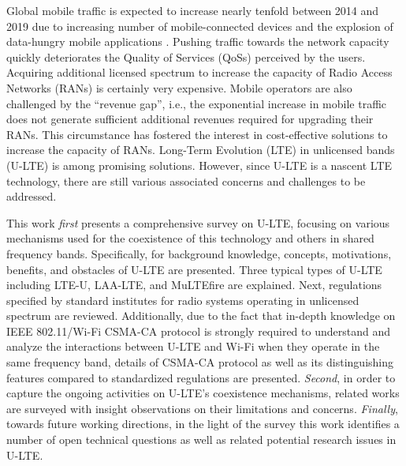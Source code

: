 \textsf{Global mobile traffic is expected to increase nearly tenfold between 2014 and 2019 due to increasing number of mobile-connected devices and the explosion of data-hungry mobile applications \cite{cisco_mobile_traffic_2015}. Pushing traffic towards the network capacity quickly deteriorates the Quality of Services (QoSs) perceived by the users. Acquiring additional licensed spectrum to increase the capacity of Radio Access Networks (RANs) is certainly very expensive. Mobile operators are also challenged by the ``revenue gap'', i.e., the exponential increase in mobile traffic does not generate sufficient additional revenues required for upgrading their RANs. This circumstance has fostered the interest in cost-effective solutions to increase the capacity of RANs. Long-Term Evolution (LTE) in unlicensed bands (U-LTE) is among promising solutions. However, since U-LTE is a nascent LTE technology, there are still various associated concerns and challenges to be addressed.}

\textsf{This work \textit{first} presents a comprehensive survey on U-LTE, focusing on various mechanisms used for the coexistence of this technology and others in shared frequency bands. Specifically, for background knowledge, concepts, motivations, benefits, and obstacles of U-LTE are presented. Three typical types of U-LTE including LTE-U, LAA-LTE, and MuLTEfire are explained. Next, regulations specified by standard institutes for radio systems operating in unlicensed spectrum are reviewed. Additionally, due to the fact that in-depth knowledge on IEEE 802.11/Wi-Fi CSMA-CA protocol is strongly required to understand and analyze the interactions between U-LTE and Wi-Fi when they operate in the same frequency band, details of CSMA-CA protocol as well as its distinguishing features compared to standardized regulations are presented. \textit{Second}, in order to capture the ongoing activities on U-LTE's coexistence mechanisms, related works are surveyed with insight observations on their limitations and concerns. \textit{Finally}, towards future working directions, in the light of the survey this work identifies a number of open technical questions as well as related potential research issues in U-LTE.}

